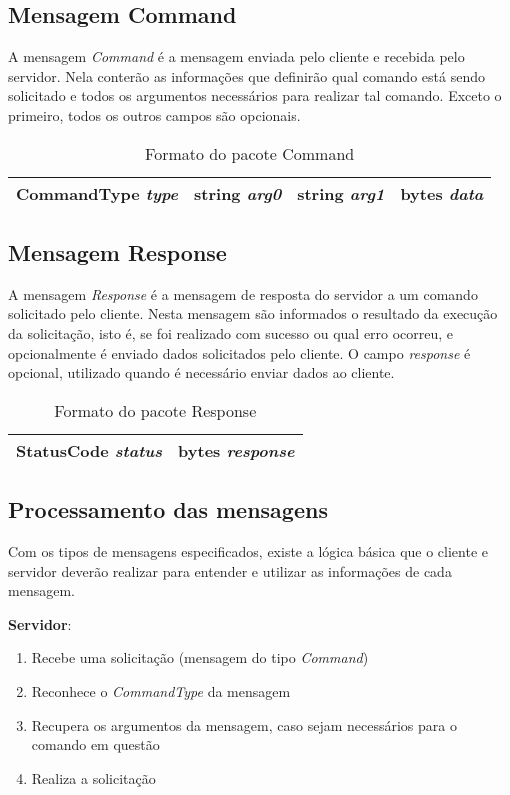 \documentclass[
	11pt,				%
	oneside,			%
	a4paper,			%
	english,			%
	brazil,				%
	]{article}
\begin{document}
\subsection{Mensagem Command}
A mensagem \textit{Command} é a mensagem enviada pelo cliente e recebida pelo servidor. Nela conterão as informações que definirão qual comando  está sendo solicitado e todos os argumentos necessários para realizar tal comando. Exceto o primeiro, todos os outros campos são opcionais.
\begin{table}[H]
\centering
\begin{tabular}{|l|l|l|l|}
\hline
CommandType \textit{type} & string \textit{arg0} & string \textit{arg1} & bytes \textit{data} \\
\hline
\end{tabular}
\caption{Formato do pacote Command}
\label{tab:matrizes}
\end{table}

\subsection{Mensagem Response}
A mensagem \textit{Response} é a mensagem de resposta do servidor a um comando solicitado pelo cliente. Nesta mensagem são informados o resultado da execução da solicitação, isto é, se foi realizado com sucesso ou qual erro ocorreu, e opcionalmente é enviado dados solicitados pelo cliente. O campo \textit{response} é opcional, utilizado quando é necessário enviar dados ao cliente.
\begin{table}[H]
\centering
\begin{tabular}{|l|l|}
\hline
StatusCode \textit{status} & bytes \textit{response} \\
\hline
\end{tabular}
\caption{Formato do pacote Response}
\label{tab:matrizes}
\end{table}

\subsection{Processamento das mensagens}
Com os tipos de mensagens especificados, existe a lógica básica que o cliente e servidor deverão realizar para entender e utilizar as informações de cada mensagem.

\noindent \textbf{Servidor}:
\begin{enumerate}
 \item Recebe uma solicitação (mensagem do tipo \textit{Command})
 \item Reconhece o \textit{CommandType} da mensagem
 \item Recupera os argumentos da mensagem, caso sejam necessários para o comando em questão
 \item Realiza a solicitação
\end{enumerate}
\end{document}
